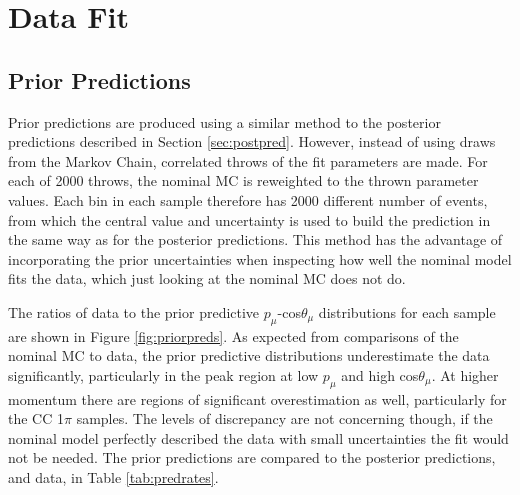 \section{Data Fit}\label{sec:datafit}

\subsection{Prior Predictions}

Prior predictions are produced using a similar method to the posterior predictions described in Section \ref{sec:postpred}. However, instead of using draws from the Markov Chain, correlated throws of the fit parameters are made. For each of 2000 throws, the nominal MC is reweighted to the thrown parameter values. Each bin in each sample therefore has 2000 different number of events, from which the central value and uncertainty is used to build the prediction in the same way as for the posterior predictions. This method has the advantage of incorporating the prior uncertainties when inspecting how well the nominal model fits the data, which just looking at the nominal MC does not do. 

The ratios of data to the prior predictive $p_{\mu}$-cos$\theta_{\mu}$ distributions for each sample are shown in Figure \ref{fig:priorpreds}. As expected from comparisons of the nominal MC to data, the prior predictive distributions underestimate the data significantly, particularly in the peak region at low $p_{\mu}$ and high cos$\theta_{\mu}$. At higher momentum there are regions of significant overestimation as well, particularly for the CC 1$\pi$ samples. The levels of discrepancy are not concerning though, if the nominal model perfectly described the data with small uncertainties the fit would not be needed. The prior predictions are compared to the posterior predictions, and data, in Table \ref{tab:predrates}.

